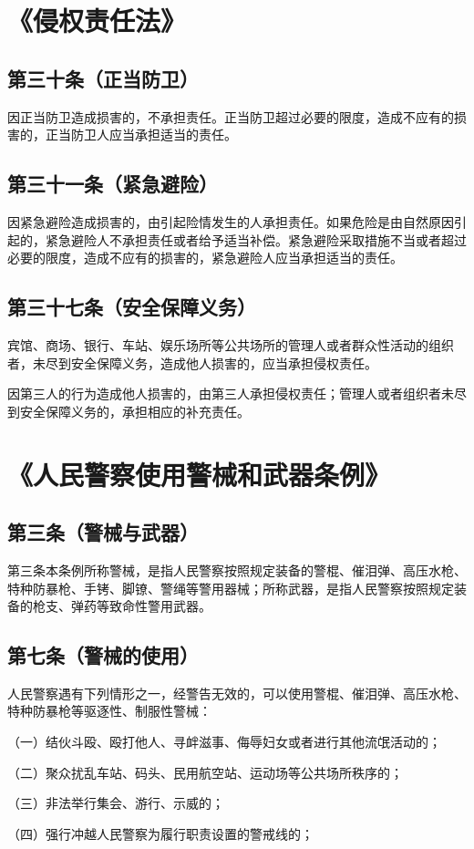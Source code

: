 \documentclass[utf-8,10pt]{ctexart}
\begin{document}
\section{《侵权责任法》}
\subsection{第三十条（正当防卫）}
因正当防卫造成损害的，不承担责任。正当防卫超过必要的限度，造成不应有的损害的，正当防卫人应当承担适当的责任。
\subsection{第三十一条（紧急避险）}
因紧急避险造成损害的，由引起险情发生的人承担责任。如果危险是由自然原因引起的，紧急避险人不承担责任或者给予适当补偿。紧急避险采取措施不当或者超过必要的限度，造成不应有的损害的，紧急避险人应当承担适当的责任。
\subsection{第三十七条（安全保障义务）}
宾馆、商场、银行、车站、娱乐场所等公共场所的管理人或者群众性活动的组织者，未尽到安全保障义务，造成他人损害的，应当承担侵权责任。

因第三人的行为造成他人损害的，由第三人承担侵权责任；管理人或者组织者未尽到安全保障义务的，承担相应的补充责任。
\section{《人民警察使用警械和武器条例》}
\subsection{第三条（警械与武器）}
第三条本条例所称警械，是指人民警察按照规定装备的警棍、催泪弹、高压水枪、特种防暴枪、手铐、脚镣、警绳等警用器械；所称武器，是指人民警察按照规定装备的枪支、弹药等致命性警用武器。
\subsection{第七条（警械的使用）}
人民警察遇有下列情形之一，经警告无效的，可以使用警棍、催泪弹、高压水枪、特种防暴枪等驱逐性、制服性警械：

（一）结伙斗殴、殴打他人、寻衅滋事、侮辱妇女或者进行其他流氓活动的；

（二）聚众扰乱车站、码头、民用航空站、运动场等公共场所秩序的；

（三）非法举行集会、游行、示威的；

（四）强行冲越人民警察为履行职责设置的警戒线的；
\end{document}
